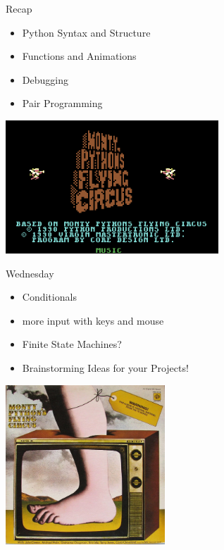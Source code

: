 \documentclass[10pt]{beamer}
\begin{document}
\begin{frame}{Recap}
    	 \begin{itemize}
	 \item Python Syntax and Structure
	 \item Functions and Animations
	 \item Debugging
	 \item Pair Programming
	\end{itemize}
	 \includegraphics[height=5cm]{images/mpfc_game}
\end{frame}

\begin{frame}{Wednesday}
    	 \begin{itemize}
	 \item Conditionals
	 \item more input with keys and mouse
	 \item Finite State Machines?
	 \item Brainstorming Ideas for your Projects!
	\end{itemize}
	 \includegraphics[height=6cm]{images/tomorrow_mpfc}
\end{frame}

\end{document}
